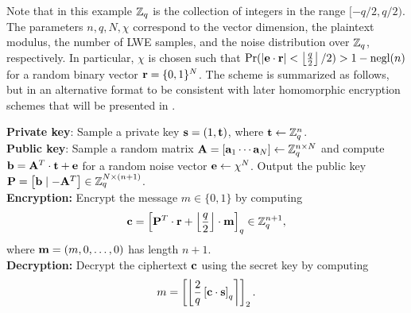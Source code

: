 \documentclass[../main.tex]{subfiles}
\begin{document}
Note that in this example $\mathbb{Z}_q$ is the collection of integers in the range $[-q/2, q/2)$.
The parameters  $n,q,N,\chi$ correspond to the vector dimension, the plaintext modulus, the number of LWE samples, and the noise distribution over $\mathbb{Z}_q$, respectively. In particular, $\chi$ is chosen such that $\text{Pr}(|\mathbf{e} \cdot \mathbf{r}| < \left\lfloor{\frac{q}{2}}\right\rfloor/2) > 1 - \text{negl}(n)$ for a random binary vector $\mathbf{r} =\{0,1\}^N$.
The scheme is summarized as follows, but in an alternative format to be consistent with later homomorphic encryption schemes that will be presented in .

\begin{tcolorbox}
\noindent
\textbf{Private key}: Sample a private key $\mathbf{s} = (1,\mathbf{t})$, where $\mathbf{t} \leftarrow \mathbb{Z}_q^n$.\\

\textbf{Public key}: Sample a random matrix $\mathbf{A} = \left[\mathbf{a}_1 \cdots \mathbf{a}_N\right] \leftarrow \mathbb{Z}_q^{n \times N}$ and compute $\mathbf{b} = \mathbf{A}^T \cdot \mathbf{t} + \mathbf{e}$ for a random noise vector $\mathbf{e} \leftarrow \chi^N$. Output the public key $\mathbf{P}=\left[{\mathbf{b} \mid -\mathbf{A}^T}\right] \in \mathbb{Z}_q^{N \times (n+1)}$.\\

\textbf{Encryption:} Encrypt the message $m \in \{0,1\}$ by computing 
\begin{align*}
    \mathbf{c}=\left[{\mathbf{P}^T \cdot \mathbf{r} + \left\lfloor{\frac{q}{2}}\right\rfloor \cdot \mathbf{m}}\right]_q \in \mathbb{Z}_q^{n+1},
\end{align*}
where $\mathbf{m}=(m, 0, \dots, 0)$ has length $n+1$.\\

\textbf{Decryption:} Decrypt the ciphertext $\mathbf{c}$ using the secret key by computing 
\begin{align*}
    m = \left[{\left\lfloor{\frac{2}{q}\left[{\mathbf{c} \cdot \mathbf{s}}\right]_q}\right\rceil}\right]_2.
\end{align*}
\end{tcolorbox}
\end{document}

